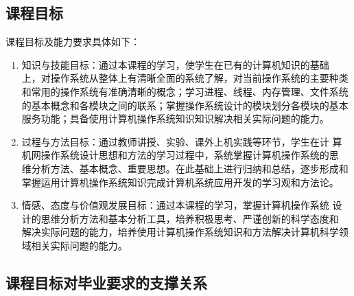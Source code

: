 \documentclass{swfusyllabus}
\begin{document}
\subsection{课程目标}

课程目标及能力要求具体如下：
\begin{enumerate}

\item 知识与技能目标：通过本课程的学习，使学生在已有的计算机知识的基础
  上，对操作系统从整体上有清晰全面的系统了解，对当前操作系统的主要种类
  和常用的操作系统有准确清晰的概念；学习进程、线程、内存管理、文件系统
  的基本概念和各模块之间的联系；掌握操作系统设计的模块划分各模块的基本
  服务功能；具备使用计算机操作系统知识知识解决相关实际问题的能力。
\item 过程与方法目标：通过教师讲授、实验、课外上机实践等环节，学生在计
  算机网操作系统设计思想和方法的学习过程中，系统掌握计算机操作系统的思
  维分析方法、基本概念、重要思想。在此基础上进行归纳和总结，逐步形成和
  掌握运用计算机操作系统知识完成计算机系统应用开发的学习观和方法论。
\item 情感、态度与价值观发展目标：通过本课程的学习，掌握计算机操作系统
  设计的思维分析方法和基本分析工具，培养积极思考、严谨创新的科学态度和
  解决实际问题的能力，培养使用计算机操作系统知识和方法解决计算机科学领
  域相关实际问题的能力。
\end{enumerate}

\subsection{课程目标对毕业要求的支撑关系}
\end{document}
